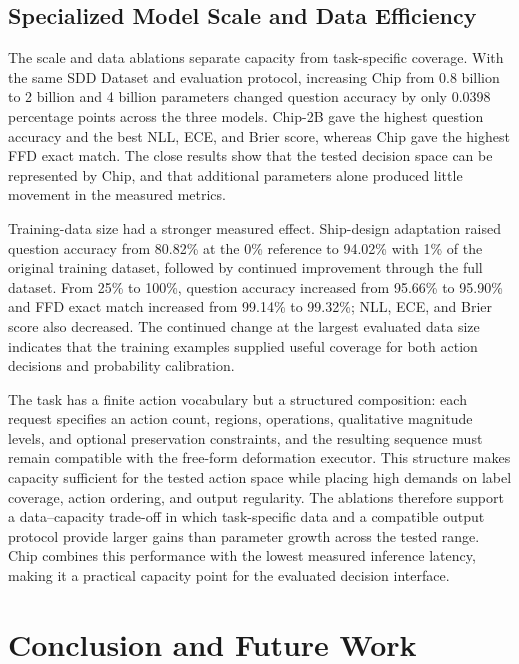 \documentclass[a4paper,fleqn]{cas-dc}
\begin{document}
\subsection{Specialized Model Scale and Data Efficiency}
\label{sec:scale-efficiency}
The scale and data ablations separate capacity from task-specific coverage. With
the same SDD Dataset and evaluation protocol, increasing Chip from 0.8 billion
to 2 billion and 4 billion parameters changed question accuracy by only 0.0398
percentage points across the three models. Chip-2B gave the highest question
accuracy and the best NLL, ECE, and Brier score, whereas Chip gave the highest FFD exact match. The close results
show that the tested decision space can be represented by Chip, and that additional parameters alone produced little movement in the
measured metrics.

Training-data size had a stronger measured effect. Ship-design adaptation raised
question accuracy from 80.82\% at the 0\% reference to 94.02\% with 1\% of the
original training dataset, followed by continued improvement through the full
dataset. From 25\% to 100\%, question accuracy increased from 95.66\% to 95.90\%
and FFD exact match increased from 99.14\% to 99.32\%; NLL, ECE, and Brier
score also decreased. The continued change
at the largest evaluated data size indicates that the training examples supplied
useful coverage for both action decisions and probability calibration.

The task has a finite action vocabulary but a structured composition: each
request specifies an action count, regions, operations, qualitative magnitude
levels, and optional preservation constraints, and the resulting sequence must
remain compatible with the free-form deformation executor. This structure makes
capacity sufficient for the tested action space while placing high demands on
label coverage, action ordering, and output regularity. The ablations therefore
support a data--capacity trade-off in which task-specific data and a compatible
output protocol provide larger gains than parameter growth across the tested
range. Chip combines this performance
with the lowest measured inference latency, making it a practical capacity point
for the evaluated decision interface.

\section{Conclusion and Future Work}
\label{sec:conclusion}
\end{document}
